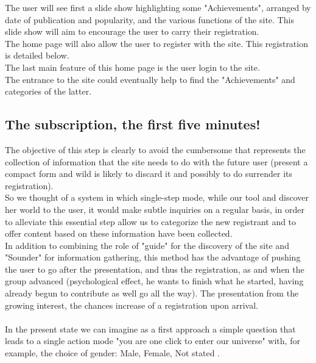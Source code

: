 \documentclass{life-fr}
\begin{document}
The user will see first a slide show highlighting some "Achievements", arranged by date of publication and popularity, and the various functions of the site. This slide show will aim to encourage the user to carry their registration.\\

The home page will also allow the user to register with the site. This registration is detailed below.\\

The last main feature of this home page is the user login to the site.\\

The entrance to the site could eventually help to find the "Achievements" and categories of the latter.

\subsection{The subscription, the first five minutes!}

The objective of this step is clearly to avoid the cumbersome that represents the collection of information that the site needs to do with the future user (present a compact form and wild is likely to discard it and possibly to do surrender its registration).\\

So we thought of a system in which single-step mode, while our tool and discover her world to the user, it would make subtle inquiries on a regular basis, in order to alleviate this essential step allow us to categorize the new registrant and to offer content based on these information have been collected.\\

In addition to combining the role of "guide" for the discovery of the site and "Sounder" for information gathering, this method has the advantage of pushing the user to go after the presentation, and thus the registration, as and when the group advanced (psychological effect, he wants to finish what he started, having already begun to contribute as well go all the way). The presentation from the growing interest, the chances increase of a registration upon arrival.\\
\\

In the present state we can imagine as a first approach a simple question that leads to a single action mode "you are one click to enter our universe" with, for example, the choice of gender: Male, Female, Not stated .
\end{document}
